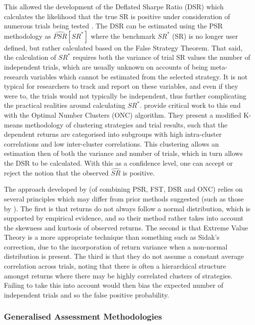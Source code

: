 \documentclass[a4paper,11pt,oneside]{article}
\theoremstyle{plain}
\theoremstyle{definition}
\begin{document}
	 This allowed the development of the Deflated Sharpe Ratio (DSR) which calculates the likelihood that the true SR is positive under consideration of numerous trials being tested \citep{BaileySharpe}. The DSR can be estimated using the PSR methodology as $\widehat{PSR}[SR^*]$ where the benchmark $SR^{*}$ (SR) is no longer user defined, but rather calculated based on the False Strategy Theorem. That said, the calculation of $SR^{*}$ requires both the variance of trial SR values the number of independent trials, which are usually unknown on accounts of being meta-research variables which cannot be estimated from the selected strategy. It is not typical for researchers to track and report on these variables, and even if they were to, the trials would not typically be independent, thus further complicating the practical realities around calculating $SR^{*}$. \citet{PradoDSR} provide critical work to this end with the Optimal Number Clusters (ONC) algorithm. They present a modified K-means methodology of clustering strategies and trial results, such that the dependent returns are categorised into subgroups with high intra-cluster correlations and low inter-cluster correlations. This clustering allows an estimation then of both the variance and number of trials, which in turn allows the DSR to be calculated. With this as a confidence level, one can accept or reject the notion that the observed $\widehat{SR}$ is positive.
		\hfill \break 
		
	The approach developed by \citet{PradoDSR} (of combining PSR, FST, DSR and ONC) relies on several principles which may differ from prior methods suggested (such as those by \citet{Harvey}). The first is that returns do not always follow a normal distribution, which is supported by empirical evidence, and so their method rather takes into account the skewness and kurtosis of observed returns. The second is that Extreme Value Theory is a more appropriate technique than something such as Sidak's correction, due to the incorporation of return variance when a non-normal distribution is present. The third is that they do not assume a  constant average correlation across trials, noting that there is often a hierarchical structure amongst returns where there may be highly correlated clusters of strategies. Failing to take this into account would then bias the expected number of independent trials and so the false positive probability. 
	
	\hfill \break
	
	\subsubsection{Generalised Assessment Methodologies}\label{lr_backtest_cscv}
	
\end{document}
